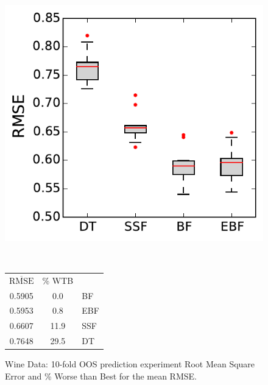 \documentclass{article}
\begin{document}
\begin{figure}
\begin{minipage}{0.5\linewidth}
\includegraphics[width=\textwidth]{../graphs/wine}
\end{minipage}
~~
\begin{minipage}{0.4\linewidth}
{\footnotesize
\begin{tabular}{c c | l}
$\overline{\text{RMSE}}$  & \% WTB & \\
\cline{1-2}\rule{0pt}{3ex} 
0.5905 &  0.0 & BF \\
0.5953 &  0.8 & EBF \\
0.6607 & 11.9 & SSF \\
0.7648 & 29.5 & DT \\
\end{tabular}}
\end{minipage}
\caption{Wine Data: 10-fold OOS prediction experiment Root Mean Square Error and \% Worse than Best for the mean RMSE. }

\end{figure}
\end{document}
